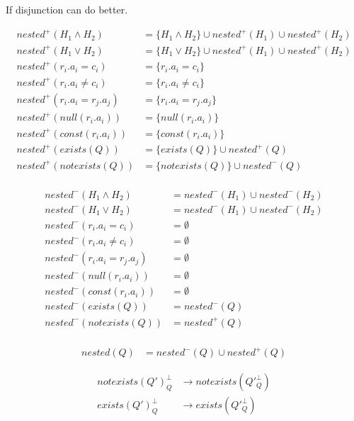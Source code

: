 If disjunction can do better.
\begin{mydef}
	
	\begin{align*}
		nested^+(H_1\land H_2) & = \{H_1 \land H_2\}  \cup nested^+(H_1) \cup nested^+(H_2) \\
		nested^+(H_1\lor H_2) & = \{H_1 \lor H_2\}  \cup nested^+(H_1) \cup nested^+(H_2) \\
		nested^+(r_i.a_i = c_i) & = \{r_i.a_i = c_i\} \\
		nested^+(r_i.a_i \neq c_i) & = \{r_i.a_i \neq c_i\} \\
		nested^+(r_i.a_i = r_j.a_j) & = \{r_i.a_i = r_j.a_j\} \\
		nested^+(null(r_i.a_i)) & = \{null(r_i.a_i)\} \\
		nested^+(const(r_i.a_i)) & = \{const(r_i.a_i)\} \\
		nested^+(exists(Q)) & = \{exists(Q)\} \cup nested^+(Q) \\
		nested^+(notexists(Q)) & = \{notexists(Q)\} \cup nested^-(Q) \\
	\end{align*}
	
	\begin{align*}
		nested^-(H_1\land H_2) & =nested^-(H_1) \cup nested^-(H_2) \\
		nested^-(H_1\lor H_2) & =  nested^-(H_1) \cup nested^-(H_2) \\
		nested^-(r_i.a_i = c_i) & = \emptyset \\
		nested^-(r_i.a_i \neq c_i) & = \emptyset \\
		nested^-(r_i.a_i = r_j.a_j) & = \emptyset \\
		nested^-(null(r_i.a_i)) & = \emptyset \\
		nested^-(const(r_i.a_i)) & = \emptyset \\
		nested^-(exists(Q)) & =nested^-(Q) \\
		nested^-(notexists(Q)) & = nested^+(Q) \\
	\end{align*}
	
	\begin{align*}
		nested(Q) & = nested^-(Q) \cup nested^+(Q)
	\end{align*}
\end{mydef}

\begin{mydef}
	\begin{align*}
		notexists(Q')^\bot_Q & \rightarrow notexists(Q'^\bot_Q)
		\\exists(Q')^\bot_Q & \rightarrow exists(Q'^\bot_Q)
	\end{align*}
\end{mydef}

